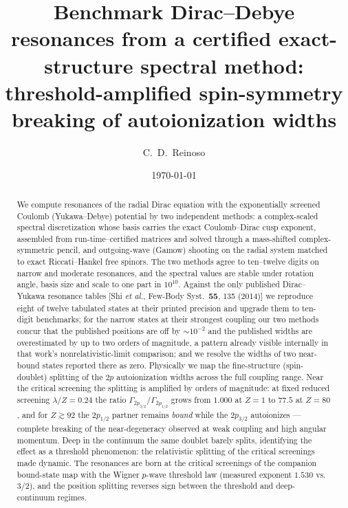 \documentclass[aps,pra,twocolumn,superscriptaddress,floatfix,longbibliography]{revtex4-2}
\begin{document}
\title{Benchmark Dirac--Debye resonances from a certified exact-structure
spectral method: threshold-amplified spin-symmetry breaking of
autoionization widths}

\author{C.~D.~Reinoso}

\date{\today}

\begin{abstract}
We compute resonances of the radial Dirac equation with the
exponentially screened Coulomb (Yukawa--Debye) potential by two
independent methods: a complex-scaled spectral discretization whose
basis carries the exact Coulomb--Dirac cusp exponent, assembled from
run-time--certified matrices and solved through a mass-shifted
complex-symmetric pencil, and outgoing-wave (Gamow) shooting on the
radial system matched to exact Riccati--Hankel free spinors. The two
methods agree to ten--twelve digits on narrow and moderate resonances,
and the spectral values are stable under rotation angle, basis size and
scale to one part in $10^{10}$. Against the only published Dirac--Yukawa
resonance tables [Shi \emph{et al.}, Few-Body Syst.\ \textbf{55}, 135
(2014)] we reproduce eight of twelve tabulated states at their printed
precision and upgrade them to ten-digit benchmarks; for the narrow
states at their strongest coupling our two methods concur that the
published positions are off by $\sim10^{-2}$ and the published widths
are overestimated by up to two orders of magnitude, a pattern already
visible internally in that work's nonrelativistic-limit comparison; and
we resolve the widths of two near-bound states reported there as zero.
Physically we map the fine-structure (spin-doublet) splitting of the
$2p$ autoionization widths across the full coupling range. Near the
critical screening the splitting is amplified by orders of magnitude:
at fixed reduced screening $\lambda/Z=0.24$ the ratio
$\Gamma_{2p_{3/2}}/\Gamma_{2p_{1/2}}$ grows from $1.000$ at $Z=1$ to
$77.5$ at $Z=80$, and for $Z\gtrsim92$ the $2p_{1/2}$ partner remains
\emph{bound} while the $2p_{3/2}$ autoionizes --- complete breaking of
the near-degeneracy observed at weak coupling and high angular momentum.
Deep in the continuum the same doublet barely splits, identifying the
effect as a threshold phenomenon: the relativistic splitting of the
critical screenings made dynamic. The resonances are born at the
critical screenings of the companion bound-state map with the Wigner
$p$-wave threshold law (measured exponent $1.530$ vs.\ $3/2$), and the
position splitting reverses sign between the threshold and
deep-continuum regimes.
\end{abstract}
\end{document}
